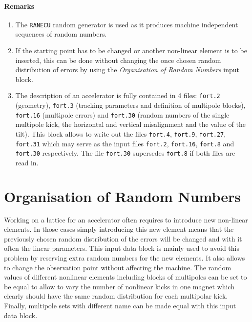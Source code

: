 \paragraph{Remarks}

\begin{enumerate}
    \item The \texttt{RANECU} random generator \cite{RANECU} is used as it produces machine independent sequences of random numbers.
    \item If the starting point has to be changed or another non-linear element is to be inserted, this can be done without changing the once chosen random distribution of errors by using the \textit{Organisation of Random Numbers} input block.
    \item The description of an accelerator is fully contained in 4 files: \texttt{fort.2} (geometry), \texttt{fort.3} (tracking parameters and definition of multipole blocks), \texttt{fort.16} (multipole errors) and \texttt{fort.30} (random numbers of the single multipole kick, the horizontal and vertical misalignment and the value of the tilt). This block allows to write  out the files \texttt{fort.4}, \texttt{fort.9}, \texttt{fort.27}, \texttt{fort.31} which may serve as the input files \texttt{fort.2}, \texttt{fort.16}, \texttt{fort.8} and \texttt{fort.30} respectively. The file \texttt{fort.30} supersedes \texttt{fort.8} if both files are read in.
\end{enumerate}

\section{Organisation of Random Numbers} \label{OrgRan}

Working on a lattice for an accelerator often requires to introduce new non-linear elements.
In those cases simply introducing this new element means that the previously chosen random distribution of the errors will be changed and with it often the linear parameters.
This input data block is mainly used to avoid this problem by reserving extra random numbers for the new elements.
It also allows to change the observation point without affecting the machine.
The random values of different nonlinear elements including blocks of multipoles can be set to be equal to allow to vary the number of nonlinear kicks in one magnet which clearly should have the same random distribution for each multipolar kick.
Finally, multipole sets with different name can be made equal with this input data block.

